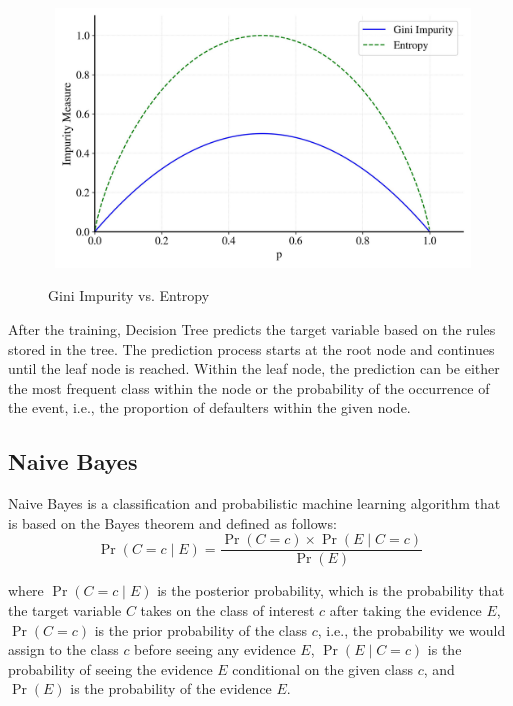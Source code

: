 \begin{figure}[H]
    \centering
    \caption{Gini Impurity vs. Entropy}\vspace{0.5em}
    \label{fig:impurity}\
    \includegraphics[width=110mm]{Figures/impurity.jpg}

    \vspace{-1em}
\end{figure}

After the training, Decision Tree predicts the target variable based on the rules stored in the tree.
The prediction process starts at the root node and continues until the leaf node is reached. Within the leaf node, the prediction can be either the most frequent class within the node or the probability of the occurrence of the event, i.e., the proportion of defaulters within the given node.
\newpage
\subsection{Naive Bayes}

Naive Bayes is a classification and probabilistic machine learning algorithm that is based on the Bayes theorem and defined as follows:
\begin{equation}\label{eq}
    \operatorname{Pr}\left(C=c \mid E \right) = \frac{\operatorname{Pr}\left(C=c\right) \times \operatorname{Pr}\left(E \mid C=c\right)}{\operatorname{Pr}\left(E\right)}
\end{equation}

where $\operatorname{Pr}\left(C=c \mid E \right)$ is the posterior probability, which is the probability that the target variable $C$ takes on the class of interest $c$ after taking the evidence $E$, $\operatorname{Pr}\left(C=c\right)$ is the prior probability of the class $c$, i.e., the probability we would assign to the class $c$ before seeing any evidence $E$, $\operatorname{Pr}\left(E \mid C=c\right)$ is the probability of seeing the evidence $E$ conditional on the given class $c$,
and $\operatorname{Pr}\left(E\right)$ is the probability of the evidence $E$.



